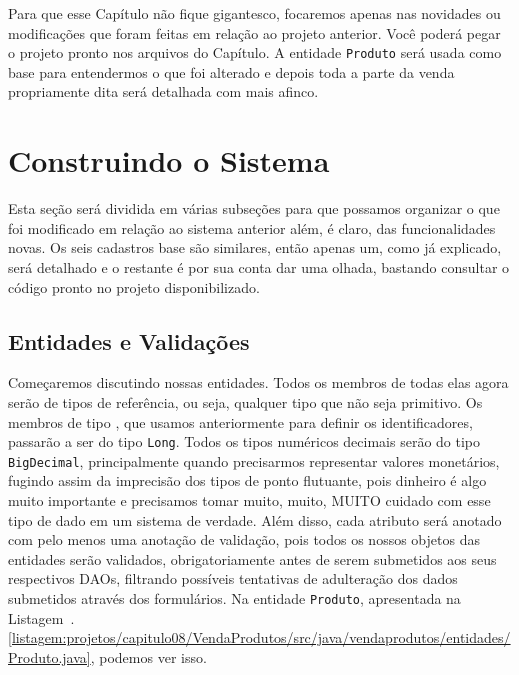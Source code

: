 Para que esse Capítulo não fique gigantesco, focaremos apenas nas novidades ou modificações que foram feitas em relação ao projeto anterior. Você poderá pegar o projeto pronto nos arquivos do Capítulo. A entidade \texttt{Produto} será usada como base para entendermos o que foi alterado e depois toda a parte da venda propriamente dita será detalhada com mais afinco.


\section{Construindo o Sistema}

Esta seção será dividida em várias subseções para que possamos organizar o que foi modificado em relação ao sistema anterior além, é claro, das funcionalidades novas. Os seis cadastros base são similares, então apenas um, como já explicado, será detalhado e o restante é por sua conta dar uma olhada, bastando consultar o código pronto no projeto disponibilizado.


\subsection{Entidades e Validações}

Começaremos discutindo nossas entidades. Todos os membros de todas elas agora serão de tipos de referência, ou seja, qualquer tipo que não seja primitivo. Os membros de tipo , que usamos anteriormente para definir os identificadores, passarão a ser do tipo \texttt{Long}. Todos os tipos numéricos decimais serão do tipo \texttt{BigDecimal}, principalmente quando precisarmos representar valores monetários, fugindo assim da imprecisão dos tipos de ponto flutuante, pois dinheiro é algo muito importante e precisamos tomar muito, muito, MUITO cuidado com esse tipo de dado em um sistema de verdade. Além disso, cada atributo será anotado com pelo menos uma anotação de validação, pois todos os nossos objetos das entidades serão validados, obrigatoriamente antes de serem submetidos aos seus respectivos DAOs, filtrando possíveis tentativas de adulteração dos dados submetidos através dos formulários. Na entidade \texttt{Produto}, apresentada na Listagem~\thechapter.\ref{listagem:projetos/capitulo08/VendaProdutos/src/java/vendaprodutos/entidades/Produto.java}, podemos ver isso.



